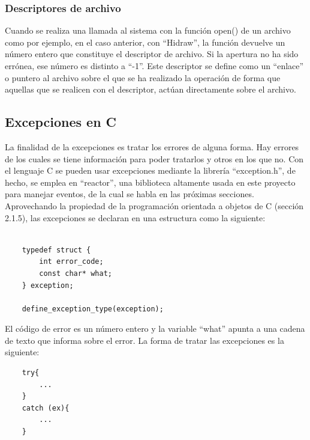 \subsubsection{Descriptores de archivo}\label{s2_1_3_2}

Cuando se realiza una llamada al sistema con la función open() de un archivo como por ejemplo, en el caso anterior, con ``Hidraw'', la función devuelve un número entero que constituye el descriptor de archivo. Si la apertura no ha sido errónea, ese número es distinto a ``-1''. Este descriptor se define como un ``enlace'' o puntero al archivo sobre el que se ha realizado la operación de forma que aquellas que se realicen con el descriptor, actúan directamente sobre el archivo.

\subsection{Excepciones en C} \label{s2_1_4}

La finalidad de la excepciones es tratar los errores de alguna forma. Hay errores de los cuales se tiene información para poder tratarlos y otros en los que no. Con el lenguaje C se pueden usar excepciones mediante la librería ``exception.h'', de hecho, se emplea en ``reactor'', una biblioteca altamente usada en este proyecto para manejar eventos, de la cual se habla en las próximas secciones. Aprovechando la propiedad de la programación orientada a objetos de C (sección 2.1.5), las excepciones se declaran en una estructura como la siguiente: \\

    \begin{verbatim}
    
    typedef struct {
        int error_code;
        const char* what;
    } exception;
    
    define_exception_type(exception);
    \end{verbatim}

El código de error es un número entero y la variable ``what'' apunta a una cadena de texto que informa sobre el error.
La forma de tratar las excepciones es la siguiente:

    \begin{verbatim}
    try{
        ...
    }
    catch (ex){
        ...
    }
    \end{verbatim}

